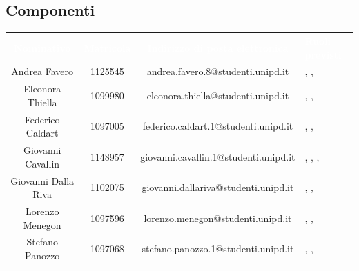 \subsection{Componenti}
\begin{longtable}{ c  c  c  C{4cm} }
	\textcolor{white}{\textbf{Nominativo}} & \textcolor{white}{\textbf{Matricola}} & \textcolor{white}{\textbf{Indirizzo di posta elettronica}} & \textcolor{white}{\textbf{Ruoli previsti}}\\
	
	Andrea Favero & 1125545 & andrea.favero.8@studenti.unipd.it & \adm, \ana, \ver \\
	
	Eleonora Thiella & 1099980 & eleonora.thiella@studenti.unipd.it & \adm, \ana, \ver \\
	
	Federico Caldart & 1097005 & federico.caldart.1@studenti.unipd.it & \adm, \ana, \ver\\
	
	Giovanni Cavallin & 1148957 & giovanni.cavallin.1@studenti.unipd.it & \RdP, \adm, \ana, \ver\\
	
	Giovanni Dalla Riva & 1102075 & giovanni.dallariva@studenti.unipd.it & \adm, \ana, \ver \\
	
	Lorenzo Menegon & 1097596 & lorenzo.menegon@studenti.unipd.it & \adm, \ana, \ver \\
	
	Stefano Panozzo & 1097068 & stefano.panozzo.1@studenti.unipd.it & \RdP, \ana, \ver\\
\end{longtable}